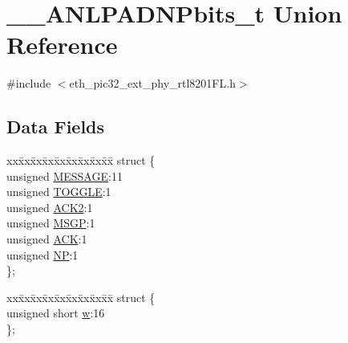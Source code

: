 \hypertarget{union_____a_n_l_p_a_d_n_pbits__t}{}\section{\+\_\+\+\_\+\+A\+N\+L\+P\+A\+D\+N\+Pbits\+\_\+t Union Reference}
\label{union_____a_n_l_p_a_d_n_pbits__t}


{\ttfamily \#include $<$eth\+\_\+pic32\+\_\+ext\+\_\+phy\+\_\+rtl8201\+F\+L.\+h$>$}

\subsection*{Data Fields}
\begin{DoxyCompactItemize}
\item 
\begin{tabbing}
xx\=xx\=xx\=xx\=xx\=xx\=xx\=xx\=xx\=\kill
struct \{\\
\>unsigned \hyperlink{union_____a_n_l_p_a_d_n_pbits__t_a06361005f0d2faefe34e0bdb1499bfe7}{MESSAGE}:11\\
\>unsigned \hyperlink{union_____a_n_l_p_a_d_n_pbits__t_ab4110904eded0b4b6a2280a6b4b9f4c2}{TOGGLE}:1\\
\>unsigned \hyperlink{union_____a_n_l_p_a_d_n_pbits__t_a04eefaff71d440a3996c7db3676475ba}{ACK2}:1\\
\>unsigned \hyperlink{union_____a_n_l_p_a_d_n_pbits__t_a8c958300dd9e82d064f59696a78d8e45}{MSGP}:1\\
\>unsigned \hyperlink{union_____a_n_l_p_a_d_n_pbits__t_a9d5913829bb2b681dc6257fc7e9b7a56}{ACK}:1\\
\>unsigned \hyperlink{union_____a_n_l_p_a_d_n_pbits__t_ac89729be1dc289730931f8238a316516}{NP}:1\\
\}; \\

\end{tabbing}\item 
\begin{tabbing}
xx\=xx\=xx\=xx\=xx\=xx\=xx\=xx\=xx\=\kill
struct \{\\
\>unsigned short \hyperlink{union_____a_n_l_p_a_d_n_pbits__t_a160850a4684a3e82c2323033964f2e98}{w}:16\\
\}; \\


\end{tabbing}
\end{DoxyCompactItemize}
